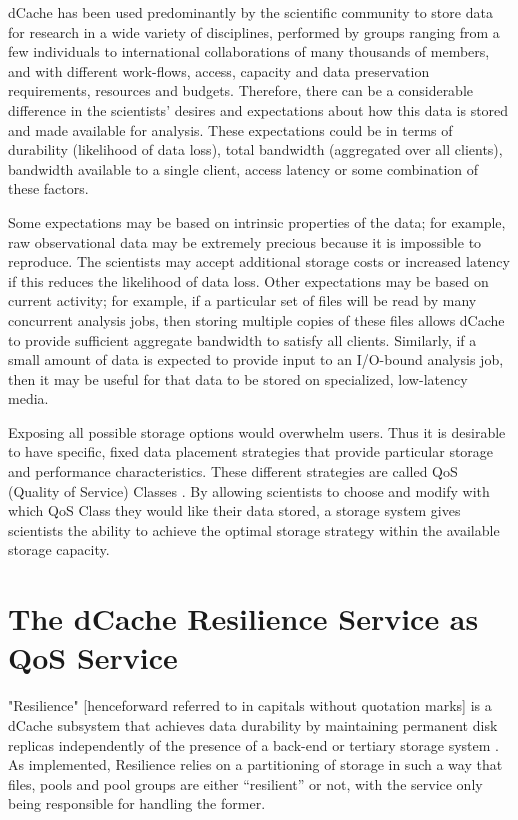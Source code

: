 \documentclass{webofc}
\begin{document}
dCache has been used predominantly by the scientific community to
store data for research in a wide variety of disciplines, performed
by groups ranging from a few individuals to international collaborations
of many thousands of members, and with different work-flows, access, 
capacity and data preservation requirements, resources and budgets. 
Therefore, there can be a considerable difference
in the  scientists’ desires  and expectations about  how this  data is
stored and made  available for analysis.  These  expectations could be
in  terms of  durability (likelihood  of data  loss), total  bandwidth
(aggregated over all clients), bandwidth available to a single client,
access latency or some combination of these factors.

Some expectations  may be based  on intrinsic properties of  the data;
for example, raw observational data  may be extremely precious because
it is impossible  to reproduce.  The scientists  may accept additional
storage costs or  increased latency if this reduces  the likelihood of
data loss.  Other  expectations may be based on  current activity; for
example, if a particular set of  files will be read by many concurrent
analysis  jobs, then  storing multiple  copies of  these files  allows
dCache  to  provide  sufficient  aggregate bandwidth  to  satisfy  all
clients.  Similarly, if a small amount  of data is expected to provide
input to an I/O-bound analysis job, then it may be useful for that data
to be stored on specialized, low-latency media.

Exposing all  possible storage options would overwhelm users. 
Thus it is desirable to have specific, fixed data
placement strategies  that provide particular storage  and performance
characteristics.  These  different strategies are called  QoS (Quality
  of Service)  Classes \cite{Millar:2017czb}.  By allowing  scientists to choose  and modify
with which  QoS Class  they would  like their  data stored,  a storage
system gives  scientists the  ability to  achieve the  optimal storage
strategy within the available storage capacity.

\section{The dCache Resilience Service as QoS Service}
\label{sec-1}


"Resilience" [henceforward referred to in capitals without quotation marks] 
is a  dCache subsystem  that achieves  data durability  by
maintaining permanent disk replicas independently of the presence of a
back-end  or tertiary  storage system \cite{Rossi:2017hxn}.  
 As implemented,  Resilience
relies on  a partitioning of storage  in such a way  that files, pools
and pool groups are either “resilient”  or not, with the service only
being responsible for handling the former.
\end{document}
